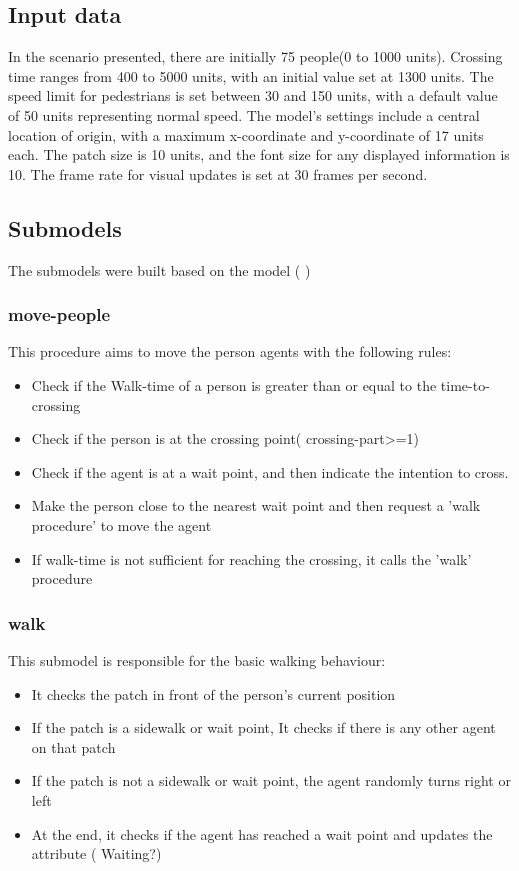 \documentclass[10pt]{report}
\numberwithin{figure}{section}
\numberwithin{table}{section}
\begin{document}
\subsection{Input data}

In the scenario presented, there are initially 75 people(0 to 1000 units). Crossing time ranges from 400 to 5000 units, with an initial value set at 1300 units. The speed limit for pedestrians is set between 30 and 150 units, with a default value of 50 units representing normal speed. The model's settings include a central location of origin, with a maximum x-coordinate and y-coordinate of 17 units each. The patch size is 10 units, and the font size for any displayed information is 10. The frame rate for visual updates is set at 30 frames per second.


\subsection{Submodels}

The submodels were built based on the model ( \cite{lukas_netlogo_nodate}) 

\subsubsection{move-people}
This procedure aims to move the person agents with the following rules:

\begin{itemize}
    \item Check if the Walk-time of a person is greater than or equal to the time-to-crossing
    \item Check if the person is at the crossing point( crossing-part>=1)
    \item Check if the agent is at a wait point, and then indicate the intention to cross.
    \item  Make the person close to the nearest wait point and then request a 'walk procedure' to move the agent
    \item  If walk-time is not sufficient for reaching the crossing, it calls the 'walk' procedure
\end{itemize}

\subsubsection{walk}
This submodel is responsible for the basic walking behaviour:

\begin{itemize}
    \item It checks the patch in front of the person's current position
    \item If the patch is a sidewalk or wait point, It checks if there is any other agent on that patch
    \item If the patch is not a sidewalk or wait point, the agent randomly turns right or left 
    \item At the end, it checks if the agent has reached a wait point and updates the attribute ( Waiting?)
\end{itemize}
\end{document}
